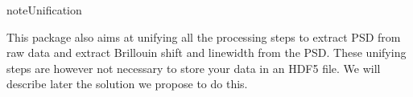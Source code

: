 \documentclass[letterpaper,10pt,english]{sphinxmanual}
\begin{document}
\begin{sphinxVerbatim}[commandchars=\\\{\}]

           
\end{sphinxVerbatim}

\begin{sphinxadmonition}{note}{Unification}

\sphinxAtStartPar
This package also aims at unifying all the processing steps to extract PSD from raw data and extract Brillouin shift and linewidth from the PSD. These unifying steps are however not necessary to store your data in an HDF5 file. We will describe later the solution we propose to do this.
\end{sphinxadmonition}
\end{document}
